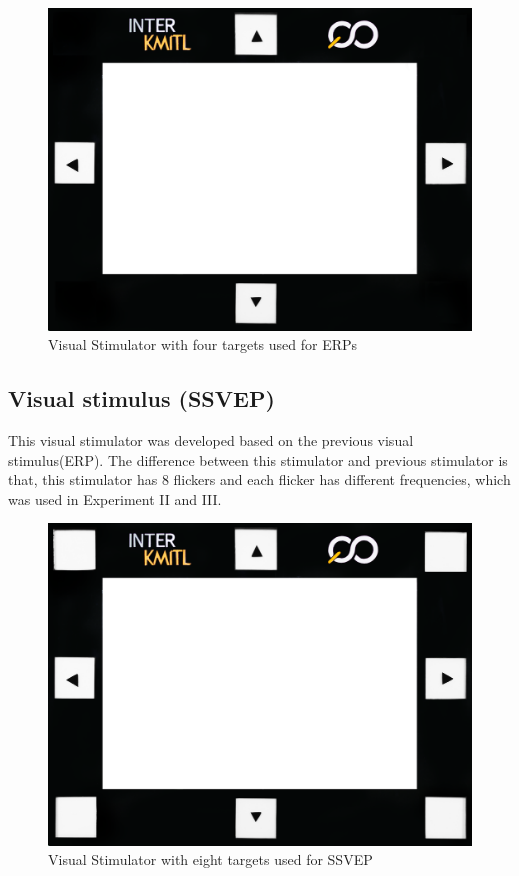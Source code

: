 \begin{figure}[ht]
	\centering
	\includegraphics[scale=0.25]{chapter7/frame_4.jpg}
	\caption{Visual Stimulator with four targets used for ERPs}
\end{figure}

\newpage
\subsection{Visual stimulus (SSVEP)}
\hspace{1.5cm} This visual stimulator was developed based on the previous visual stimulus(ERP). The difference between this stimulator and previous stimulator is that, this stimulator has 8 flickers and each flicker has different frequencies, which was used in Experiment II and III.

\begin{figure}[ht]
	\centering
	\includegraphics[scale=0.25]{chapter7/frame_8.jpg}
	\caption{Visual Stimulator with eight targets used for SSVEP}
\end{figure}

